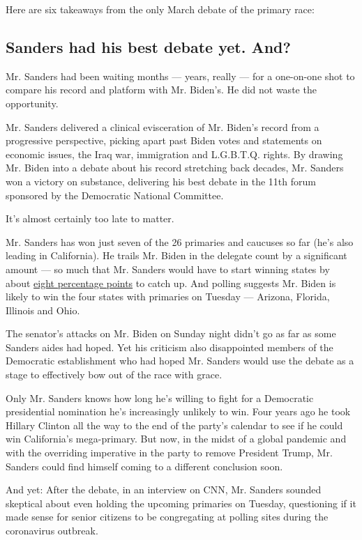 Here are six takeaways from the only March debate of the primary race:

\hypertarget{sanders-had-his-best-debate-yet-and}{%
\subsection{Sanders had his best debate yet.
And?}\label{sanders-had-his-best-debate-yet-and}}

Mr. Sanders had been waiting months --- years, really --- for a
one-on-one shot to compare his record and platform with Mr. Biden's. He
did not waste the opportunity.

Mr. Sanders delivered a clinical evisceration of Mr. Biden's record from
a progressive perspective, picking apart past Biden votes and statements
on economic issues, the Iraq war, immigration and L.G.B.T.Q. rights. By
drawing Mr. Biden into a debate about his record stretching back
decades, Mr. Sanders won a victory on substance, delivering his best
debate in the 11th forum sponsored by the Democratic National Committee.

It's almost certainly too late to matter.

Mr. Sanders has won just seven of the 26 primaries and caucuses so far
(he's also leading in California). He trails Mr. Biden in the delegate
count by a significant amount --- so much that Mr. Sanders would have to
start winning states by about
\href{https://www.nytimes.com/2020/03/11/upshot/sanders-biden-delegate-analysis.html}{eight
percentage points} to catch up. And polling suggests Mr. Biden is likely
to win the four states with primaries on Tuesday --- Arizona, Florida,
Illinois and Ohio.

The senator's attacks on Mr. Biden on Sunday night didn't go as far as
some Sanders aides had hoped. Yet his criticism also disappointed
members of the Democratic establishment who had hoped Mr. Sanders would
use the debate as a stage to effectively bow out of the race with grace.

Only Mr. Sanders knows how long he's willing to fight for a Democratic
presidential nomination he's increasingly unlikely to win. Four years
ago he took Hillary Clinton all the way to the end of the party's
calendar to see if he could win California's mega-primary. But now, in
the midst of a global pandemic and with the overriding imperative in the
party to remove President Trump, Mr. Sanders could find himself coming
to a different conclusion soon.

And yet: After the debate, in an interview on CNN, Mr. Sanders sounded
skeptical about even holding the upcoming primaries on Tuesday,
questioning if it made sense for senior citizens to be congregating at
polling sites during the coronavirus outbreak.


